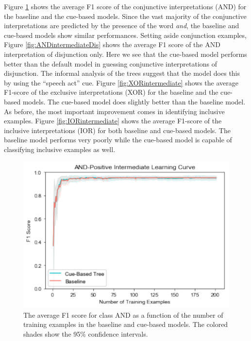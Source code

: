 \documentclass[floatsintext,man]{apa6}
\theoremstyle{definition}
\theoremstyle{definition}
\theoremstyle{definition}
\theoremstyle{remark}
\begin{document}
Figure \ref{fig:ANDintermediate} shows the average F1 score of the
conjunctive interpretations (AND) for the baseline and the cue-based
models. Since the vast majority of the conjunctive interpretations are
predicted by the presence of the word \emph{and}, the baseline and
cue-based models show similar performances. Setting aside conjunction
examples, Figure \ref{fig:ANDintermediateDis} shows the average F1 score
of the AND interpretation of disjunction only. Here we see that the
cue-based model performs better than the default model in guessing
conjunctive interpretations of disjunction. The informal analysis of the
trees suggest that the model does this by using the \enquote{speech act}
cue. Figure \ref{fig:XORintermediate} shows the average F1-score of the
exclusive interpretations (XOR) for the baseline and the cue-based
models. The cue-based model does slightly better than the baseline
model. As before, the most important improvement comes in identifying
inclusive examples. Figure \ref{fig:IORintermediate} shows the average
F1-score of the inclusive interpretations (IOR) for both baseline and
cue-based models. The baseline model performs very poorly while the
cue-based model is capable of classifying inclusive examples as well.

\begin{figure}
\centering
\includegraphics{figs/ANDintermediate-1.pdf}
\caption{\label{fig:ANDintermediate}The average F1 score for class AND as a
function of the number of training examples in the baseline and
cue-based models. The colored shades show the 95\% confidence
intervals.}
\end{figure}
\end{document}

